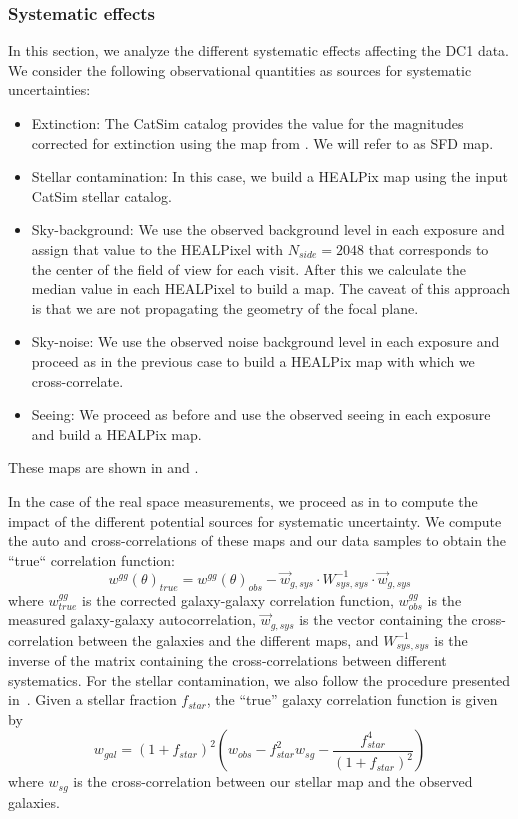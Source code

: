 \documentclass[twocolumn]{aastex62}
\begin{document}
\subsubsection{Systematic effects}
\label{ssec:systematics}
In this section, we analyze the different systematic effects affecting the DC1 data. We consider the following observational quantities as sources for systematic uncertainties:
\begin{itemize}
\item Extinction: The CatSim catalog provides the value for the magnitudes corrected for extinction using the map from \citet{1998ApJ...500..525S}. We will refer to as SFD map.
\item Stellar contamination: In this case, we build a HEALPix map using the input CatSim stellar catalog.
\item Sky-background: We use the observed background level in each exposure and assign that value to the HEALPixel with $N_{side}=2048$ that corresponds to the center of the field of view for each visit. After this we calculate the median value in each HEALPixel to build a map. The caveat of this approach is that we are not propagating the geometry of the focal plane.
\item Sky-noise: We use the observed noise background level in each exposure and proceed as in the previous case to build a HEALPix map with which we cross-correlate.
\item Seeing: We proceed as before and use the observed seeing in each exposure and build a HEALPix map.
\end{itemize}
These maps are shown in  and .

In the case of the real space measurements, we proceed as in \citet{2016MNRAS.455.4301C} to compute the impact of the different potential sources for systematic uncertainty. We compute the auto and cross-correlations of these maps and our data samples to obtain the ``true`` correlation function:
\begin{equation}
w^{gg}(\theta)_{true} =w^{gg}(\theta)_{obs} -  \vec{w}_{g,sys} \cdot W_{sys,sys}^{-1} \cdot \vec{w}_{g,sys}
\end{equation}
where $w^{gg}_{true}$ is the corrected galaxy-galaxy correlation function, $w^{gg}_{obs}$ is the measured galaxy-galaxy autocorrelation, $\vec{w}_{g,sys}$ is the vector containing the cross-correlation between the galaxies and the different maps, and $W_{sys,sys}^{-1}$ is the inverse of the matrix containing the cross-correlations between different systematics. For the stellar contamination, we also follow the procedure presented in~\citet{2016MNRAS.455.4301C}. Given a stellar fraction $f_{star}$, the ``true'' galaxy correlation function is given by
\begin{equation}
w_{gal} = \left(1+f_{star}\right)^{2}\left(w_{obs} - f_{star}^{2}w_{sg} - \frac{f_{star}^{4}}{\left(1+f_{star}\right)^{2}}\right)
\end{equation}
where $w_{sg}$ is the cross-correlation between our stellar map and the observed galaxies.
\end{document}
